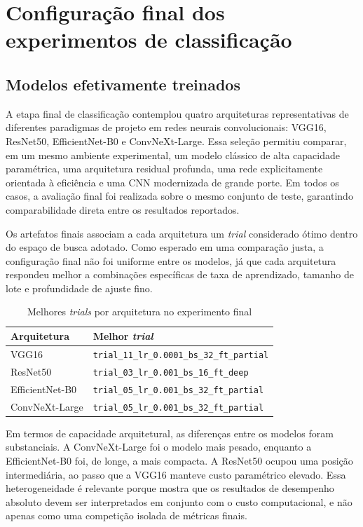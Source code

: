 \documentclass[tcc,capa]{texufpel}
\begin{document}
\section{Configuração final dos experimentos de classificação}

\subsection{Modelos efetivamente treinados}

A etapa final de classificação contemplou quatro arquiteturas representativas de diferentes paradigmas de projeto em redes neurais convolucionais: VGG16, ResNet50, EfficientNet-B0 e ConvNeXt-Large. Essa seleção permitiu comparar, em um mesmo ambiente experimental, um modelo clássico de alta capacidade paramétrica, uma arquitetura residual profunda, uma rede explicitamente orientada à eficiência e uma CNN modernizada de grande porte. Em todos os casos, a avaliação final foi realizada sobre o mesmo conjunto de teste, garantindo comparabilidade direta entre os resultados reportados.

Os artefatos finais associam a cada arquitetura um \textit{trial} considerado ótimo dentro do espaço de busca adotado. Como esperado em uma comparação justa, a configuração final não foi uniforme entre os modelos, já que cada arquitetura respondeu melhor a combinações específicas de taxa de aprendizado, tamanho de lote e profundidade de ajuste fino.

\begin{table}[htbp]
	\centering
	\caption{Melhores \textit{trials} por arquitetura no experimento final}
	\label{tab:best_trials_modelos}
	\begin{tabular}{|l|l|}
		\hline
		\textbf{Arquitetura} & \textbf{Melhor \textit{trial}} \\ \hline
		VGG16 & \texttt{trial\_11\_lr\_0.0001\_bs\_32\_ft\_partial} \\ \hline
		ResNet50 & \texttt{trial\_03\_lr\_0.001\_bs\_16\_ft\_deep} \\ \hline
		EfficientNet-B0 & \texttt{trial\_05\_lr\_0.001\_bs\_32\_ft\_partial} \\ \hline
		ConvNeXt-Large & \texttt{trial\_05\_lr\_0.001\_bs\_32\_ft\_partial} \\ \hline
	\end{tabular}
\end{table}

Em termos de capacidade arquitetural, as diferenças entre os modelos foram substanciais. A ConvNeXt-Large foi o modelo mais pesado, enquanto a EfficientNet-B0 foi, de longe, a mais compacta. A ResNet50 ocupou uma posição intermediária, ao passo que a VGG16 manteve custo paramétrico elevado. Essa heterogeneidade é relevante porque mostra que os resultados de desempenho absoluto devem ser interpretados em conjunto com o custo computacional, e não apenas como uma competição isolada de métricas finais.
\end{document}

